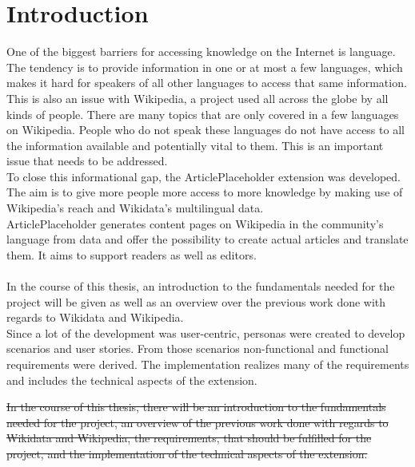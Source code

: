 \chapter{Introduction}

One of the biggest barriers for accessing knowledge on the Internet is language. The tendency is to provide information in one or at most a few languages, which makes it hard for speakers of all other languages to access that same information. This is also an issue with Wikipedia, a project used all across the globe by all kinds of people. There are many topics that are only covered in a few languages on Wikipedia. People who do not speak these languages do not have access to all the information available and potentially vital to them. This is an important issue that needs to be addressed. \\

To close this informational gap, the ArticlePlaceholder extension was developed. The aim is to give more people more access to more knowledge by making use of Wikipedia’s reach and Wikidata’s multilingual data. \\
ArticlePlaceholder generates content pages on Wikipedia in the community's language from data and offer the possibility to create actual articles and translate them. It aims to support readers as well as editors. \\
\\
In the course of this thesis, an introduction to the fundamentals needed for the project will be given as well as an overview over the previous work done with regards to Wikidata and Wikipedia. \\
Since a lot of the development was user-centric, personas were created to develop scenarios and user stories. From those scenarios non-functional and functional requirements were derived. The implementation realizes many of the requirements and includes the technical aspects of the extension.

\st{In the course of this thesis, there will be an introduction to the fundamentals needed for the project, an overview of the previous work done with regards to Wikidata and Wikipedia, the requirements, that should be fulfilled for the project, and the implementation of the technical aspects of the extension.} 